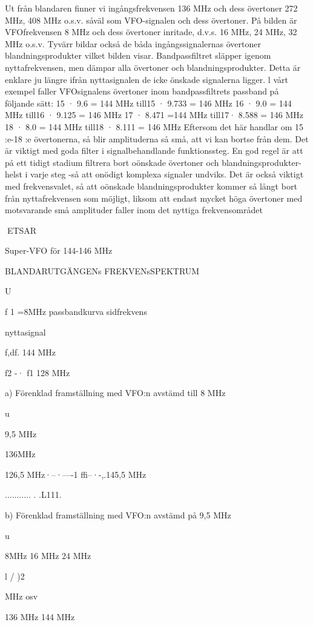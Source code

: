 \documentclass[a4paper,twoside,twocolumn,openright]{book}
\begin{document}
{{{{Ut från blandaren finner vi ingångsfrekvensen 136 MHz och dess övertoner 272
MHz, 408 MHz o.s.v. såväl som VFO-signalen och dess övertoner. På bilden är VFOfrekvensen 8 MHz och dess övertoner inritade, d.v.s. 16 MHz, 24 MHz, 32 MHz o.s.v.
Tyvärr bildar också de båda ingångssignalernas övertoner blandningsprodukter vilket bilden visar.
Bandpassfiltret släpper igenom nyttafrekvensen, men dämpar alla övertoner och
blandningsprodukter. Detta är enklare ju
längre ifrån nyttasignalen de icke önskade
signalerna ligger. l vårt exempel faller VFOsignalens övertoner inom bandpassfiltrets
passband på följande sätt:
15 · 9.6 = 144 MHz till15 · 9.733 = 146 MHz
16 · 9.0 = 144 MHz till16 · 9.125 = 146 MHz
17 · 8.471 =144 MHz till17· 8.588 = 146 MHz
18 · 8.0 = 144 MHz till18 · 8.111 = 146 MHz
Eftersom det här handlar om 15 :e-18 :e
övertonerna, så blir amplituderna så små, att
vi kan bortse från dem.
Det är viktigt med goda filter i signalbehandlande funktionssteg. En god regel är att
på ett tidigt stadium filtrera bort oönskade
övertoner och blandningsprodukter-helst i
varje steg -så att onödigt komplexa signaler
undviks. Det är också viktigt med frekvensvalet, så att oönskade blandningsprodukter
kommer så långt bort från nyttafrekvensen
som möjligt, liksom att endast mycket höga
övertoner med motsvarande små amplituder faller inom det nyttiga frekvensområdet

ETSAR

Super-VFO för 144-146 MHz

BLANDARUTGÄNGENs FREKVENsSPEKTRUM

U

f 1 =8MHz
passbandkurva
sidfrekvens

nyttasignal

f,df.
144 MHz

f2 -· f1
128 MHz

a) Förenklad framställning med VFO:n avstämd till 8 MHz

u

9,5 MHz

136MHz

126,5 MHz·--·----1 ffi--·-,.145,5 MHz

........... . .L111.

b) Förenklad framställning med VFO:n avstämd på 9,5 MHz

u

8MHz
16 MHz
24 MHz

l / )2

MHz osv

136 MHz
144 MHz

}}}}
\end{document}
